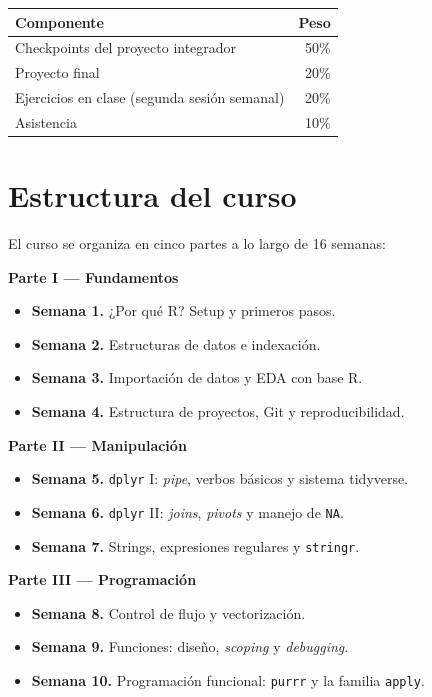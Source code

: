 \documentclass[11pt,letterpaper]{article}
\begin{document}
\begin{center}
\begin{tabular}{lr}
\toprule
\textbf{Componente} & \textbf{Peso} \\
\midrule
Checkpoints del proyecto integrador           & 50\% \\
Proyecto final                                & 20\% \\
Ejercicios en clase (segunda sesión semanal)  & 20\% \\
Asistencia                                    & 10\%  \\
\bottomrule
\end{tabular}
\end{center}

\section{Estructura del curso}

El curso se organiza en cinco partes a lo largo de 16 semanas:

\smallskip
\noindent\textbf{\textcolor{main}{Parte I --- Fundamentos}}
\begin{itemize}[leftmargin=*, itemsep=1pt]
    \item \textbf{Semana 1.} ¿Por qué R? Setup y primeros pasos.
    \item \textbf{Semana 2.} Estructuras de datos e indexación.
    \item \textbf{Semana 3.} Importación de datos y EDA con base R.
    \item \textbf{Semana 4.} Estructura de proyectos, Git y reproducibilidad.
\end{itemize}

\smallskip
\noindent\textbf{\textcolor{main}{Parte II --- Manipulación}}
\begin{itemize}[leftmargin=*, itemsep=1pt]
    \item \textbf{Semana 5.} \texttt{dplyr} I: \textit{pipe}, verbos básicos y sistema tidyverse.
    \item \textbf{Semana 6.} \texttt{dplyr} II: \textit{joins}, \textit{pivots} y manejo de \texttt{NA}.
    \item \textbf{Semana 7.} Strings, expresiones regulares y \texttt{stringr}.
\end{itemize}

\smallskip
\noindent\textbf{\textcolor{main}{Parte III --- Programación}}
\begin{itemize}[leftmargin=*, itemsep=1pt]
    \item \textbf{Semana 8.} Control de flujo y vectorización.
    \item \textbf{Semana 9.} Funciones: diseño, \textit{scoping} y \textit{debugging}.
    \item \textbf{Semana 10.} Programación funcional: \texttt{purrr} y la familia \texttt{apply}.
\end{itemize}
\end{document}
